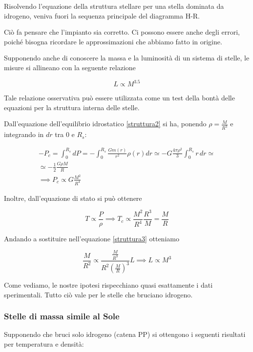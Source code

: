 Risolvendo l'equazione della struttura stellare per una stella dominata da idrogeno, veniva fuori la sequenza principale del diagramma H-R.

Ciò fa pensare che l'impianto sia corretto. Ci possono essere anche degli errori, poiché bisogna ricordare le approssimazioni che abbiamo fatto in origine.

Supponendo anche di conoscere la massa e la luminosità di un sistema di stelle, le misure si allineano con la seguente relazione

$$L\propto M^{3.5}$$

Tale relazione osservativa può essere utilizzata come un test della bontà delle
equazioni per la struttura interna delle stelle.

Dall'equazione dell'equilibrio idrostatico \eqref{struttura2} si ha, ponendo $\rho=\frac{M}{R^3}$ e integrando in $dr$ tra $0$ e $R_s$:

\begin{gather*}
    -P_c= \int_{0}^{R_s} dP
    =-\int_{0}^{R_s} \frac{Gm(r)}{r^2}\rho(r)dr
    \simeq -G\frac{4\pi\rho^2}{3} \int_{0}^{R_s} r \, dr \simeq
    \\
    \simeq -\frac{1}{2} \frac{G \rho M}{R}\\
    \implies P_c\propto G\frac{M^2}{R^4}
\end{gather*}

Inoltre, dall'equazione di stato si può ottenere

\begin{equation*}
    T\propto \frac{P}{\rho}
    \implies
    T_c\propto \frac{M^2}{R^4}\frac{R^3}{M}=\frac{M}{R}
\end{equation*}

Andando a sostituire nell'equazione \ref{struttura3} otteniamo

$$\frac{M}{R^2}\propto \frac{\frac{M}{R^3}}{R^2\left( \frac{M}{R} \right)^3}L\implies L\propto M^3$$

Come vediamo, le nostre ipotesi rispecchiano quasi esattamente i dati sperimentali. Tutto ciò vale per le stelle che bruciano idrogeno.

\subsubsection{Stelle di massa simile al Sole}

Supponendo che bruci solo idrogeno (catena PP) si ottengono i seguenti risultati per temperatura e densità:


